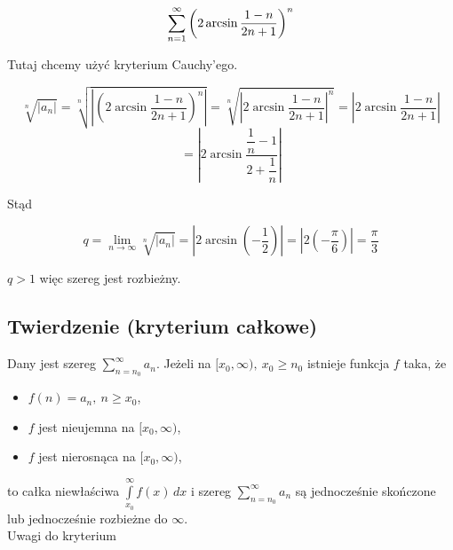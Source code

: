 \begin{przyklad}

$$ \sum\limits_{n = 1}^{\infty} \left( 2\arcsin \frac{1 - n}{2n + 1} \right)^n $$

Tutaj chcemy użyć kryterium Cauchy'ego.

$$ \sqrt[n]{|a_n|} = \sqrt[n]{ \left| \left( 2\arcsin \frac{1-n}{2n+1} \right)^n \right| } 
= \sqrt[n]{ \left| 2\arcsin \frac{1-n}{2n+1} \right|^n } = \left| 2\arcsin \frac{1-n}{2n+1} \right| $$
$$= \left| 2\arcsin \frac{ \dfrac{1}{n} - 1  }{ 2 + \dfrac{1}{n} } \right| $$

Stąd 

$$ q = \lim_{n \to \infty} \sqrt[n]{|a_n|} = \left| 2\arcsin \left( -\frac{1}{2} \right) \right|
= \left| 2 \left( - \frac{\pi}{6} \right) \right| = \frac{\pi}{3} $$

$q > 1$ więc szereg jest rozbieżny.
\end{przyklad}


\subsection*{Twierdzenie (kryterium całkowe)}

Dany jest szereg $ \sum\limits_{n = n_0}^{\infty} a_n $. Jeżeli na $ [x_0, \infty), \ x_0 \geq n_0 $ istnieje funkcja $f$
taka, że 

\begin{itemize}
    \item $ f(n) = a_n, \ n \geq x_0 $,\
    \item $f$ jest nieujemna na $[x_0, \infty)$,
    \item $f$ jest nierosnąca na $[x_0, \infty)$,
\end{itemize}

to całka niewłaściwa $ \int\limits_{x_0}^{\infty} f(x) \,dx $ i szereg $ \sum\limits_{n = n_0}^{\infty} a_n $ są
jednocześnie skończone lub jednocześnie rozbieżne do $\infty$. \\

Uwagi do kryterium

